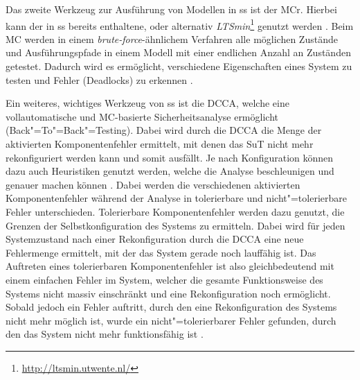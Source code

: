 Das zweite Werkzeug zur Ausführung von Modellen in \gls{ss} ist der \gls{MCr}.
Hierbei kann der in \gls{ss} bereits enthaltene, oder alternativ \emph{LTSmin}\footnote{\url{http://ltsmin.utwente.nl/}} genutzt werden \cite{SSWikiModelChecking,Habermaier2016}.
Beim \gls{MC} werden in einem \emph{brute-force}-ähnlichem Verfahren alle möglichen Zustände und Ausführungspfade in einem Modell mit einer endlichen Anzahl an Zuständen getestet.
Dadurch wird es ermöglicht, verschiedene Eigenschaften eines System zu testen und Fehler (\zB Deadlocks) zu erkennen \cite{Grumberg1999}.

Ein weiteres, wichtiges Werkzeug von \gls{ss} ist die \gls{DCCA}, welche eine vollautomatische und \gls{MC}-basierte Sicherheitsanalyse ermöglicht (Back"=To"=Back"=Testing).
Dabei wird durch die \gls{DCCA} die Menge der aktivierten Komponentenfehler ermittelt, mit denen das \gls{SuT} nicht mehr rekonfiguriert werden kann und somit ausfällt.
Je nach Konfiguration können dazu auch Heuristiken genutzt werden, welche die Analyse beschleunigen und genauer machen können \cite{Eberhardinger2016}.
Dabei werden die verschiedenen aktivierten Komponentenfehler während der Analyse in tolerierbare und nicht"=tolerierbare Fehler unterschieden.
Tolerierbare Komponentenfehler werden dazu genutzt, die Grenzen der Selbstkonfiguration des Systems zu ermitteln.
Dabei wird für jeden Systemzustand nach einer Rekonfiguration durch die \gls{DCCA} eine neue Fehlermenge ermittelt, mit der das System gerade noch lauffähig ist.
Das Auftreten eines tolerierbaren Komponentenfehler ist also gleichbedeutend mit einem einfachen Fehler im System, welcher die gesamte Funktionsweise des Systems nicht massiv einschränkt und eine Rekonfiguration noch ermöglicht.
Sobald jedoch ein Fehler auftritt, durch den eine Rekonfiguration des Systems nicht mehr möglich ist, wurde ein nicht"=tolerierbarer Fehler gefunden, durch den das System nicht mehr funktionsfähig ist \cite{Habermaier2015}.
